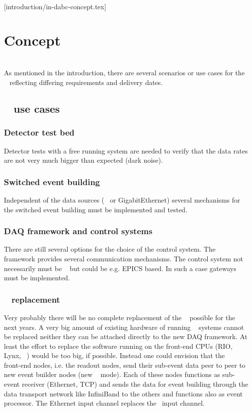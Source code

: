 [introduction/in-dabc-concept.tex]
\section{Concept}
\\
As mentioned in the introduction, there are several scenarios or
use cases for the \DDA~ reflecting differing requirements and
delivery dates.
\subsection{\DDA~ use cases}
\subsubsection{Detector test bed}
Detector tests with a free running system are needed to verify
that the data rates are not very much bigger than expected (dark
noise).
\subsubsection{Switched event building}
Independent of the data sources (\ABB~ or GigabitEthernet) several mechanisms for the switched
event building must be implemented and tested.
\subsubsection{DAQ framework and control systems}
There are still several options for the choice of the control system. The \xdaq~ framework
provides several communication mechanisms. The control system not necessarily must be \xdaq~ but
could be e.g. EPICS based. In such a case gateways must be implemented.
\subsubsection{\mbs~ replacement}
 Very probably there will be no complete
replacement of the \mbs~ possible for the next years. A very big
amount of existing hardware of running \mbs~ systems cannot be
replaced neither they can be attached directly to the new DAQ
framework. At least the effort to replace the software running on
the front-end CPUs (RIO, Lynx, \mbs~) would be too big, if
possible. Instead one could envision that the \mbs~ front-end
nodes, i.e. the readout nodes, send their sub-event data peer to
peer to new event builder nodes (new \mbs~ mode). Each of these
nodes functions as sub-event receiver (Ethernet, TCP) and sends
the data for event building through the data transport network
like InfiniBand to the others and functions also as event
processor. The Ethernet input channel replaces the \ABB~input
channel.
